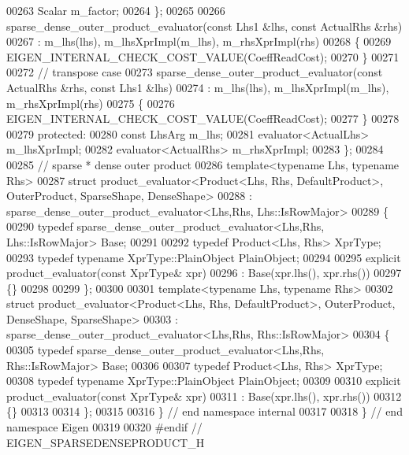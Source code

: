 \begin{DoxyCode}
00263     Scalar m\_factor;
00264   \};
00265   
00266   sparse\_dense\_outer\_product\_evaluator(\textcolor{keyword}{const} Lhs1 &lhs, \textcolor{keyword}{const} ActualRhs &rhs)
00267      : m\_lhs(lhs), m\_lhsXprImpl(m\_lhs), m\_rhsXprImpl(rhs)
00268   \{
00269     EIGEN\_INTERNAL\_CHECK\_COST\_VALUE(CoeffReadCost);
00270   \}
00271   
00272   \textcolor{comment}{// transpose case}
00273   sparse\_dense\_outer\_product\_evaluator(\textcolor{keyword}{const} ActualRhs &rhs, \textcolor{keyword}{const} Lhs1 &lhs)
00274      : m\_lhs(lhs), m\_lhsXprImpl(m\_lhs), m\_rhsXprImpl(rhs)
00275   \{
00276     EIGEN\_INTERNAL\_CHECK\_COST\_VALUE(CoeffReadCost);
00277   \}
00278     
00279 \textcolor{keyword}{protected}:
00280   \textcolor{keyword}{const} LhsArg m\_lhs;
00281   evaluator<ActualLhs> m\_lhsXprImpl;
00282   evaluator<ActualRhs> m\_rhsXprImpl;
00283 \};
00284 
00285 \textcolor{comment}{// sparse * dense outer product}
00286 \textcolor{keyword}{template}<\textcolor{keyword}{typename} Lhs, \textcolor{keyword}{typename} Rhs>
00287 \textcolor{keyword}{struct }product\_evaluator<Product<Lhs, Rhs, DefaultProduct>, OuterProduct, SparseShape, DenseShape>
00288   : sparse\_dense\_outer\_product\_evaluator<Lhs,Rhs, Lhs::IsRowMajor>
00289 \{
00290   \textcolor{keyword}{typedef} sparse\_dense\_outer\_product\_evaluator<Lhs,Rhs, Lhs::IsRowMajor> Base;
00291   
00292   \textcolor{keyword}{typedef} Product<Lhs, Rhs> XprType;
00293   \textcolor{keyword}{typedef} \textcolor{keyword}{typename} XprType::PlainObject PlainObject;
00294 
00295   \textcolor{keyword}{explicit} product\_evaluator(\textcolor{keyword}{const} XprType& xpr)
00296     : Base(xpr.lhs(), xpr.rhs())
00297   \{\}
00298   
00299 \};
00300 
00301 \textcolor{keyword}{template}<\textcolor{keyword}{typename} Lhs, \textcolor{keyword}{typename} Rhs>
00302 \textcolor{keyword}{struct }product\_evaluator<Product<Lhs, Rhs, DefaultProduct>, OuterProduct, DenseShape, SparseShape>
00303   : sparse\_dense\_outer\_product\_evaluator<Lhs,Rhs, Rhs::IsRowMajor>
00304 \{
00305   \textcolor{keyword}{typedef} sparse\_dense\_outer\_product\_evaluator<Lhs,Rhs, Rhs::IsRowMajor> Base;
00306   
00307   \textcolor{keyword}{typedef} Product<Lhs, Rhs> XprType;
00308   \textcolor{keyword}{typedef} \textcolor{keyword}{typename} XprType::PlainObject PlainObject;
00309 
00310   \textcolor{keyword}{explicit} product\_evaluator(\textcolor{keyword}{const} XprType& xpr)
00311     : Base(xpr.lhs(), xpr.rhs())
00312   \{\}
00313   
00314 \};
00315 
00316 \} \textcolor{comment}{// end namespace internal}
00317 
00318 \} \textcolor{comment}{// end namespace Eigen}
00319 
00320 \textcolor{preprocessor}{#endif // EIGEN\_SPARSEDENSEPRODUCT\_H}
\end{DoxyCode}
